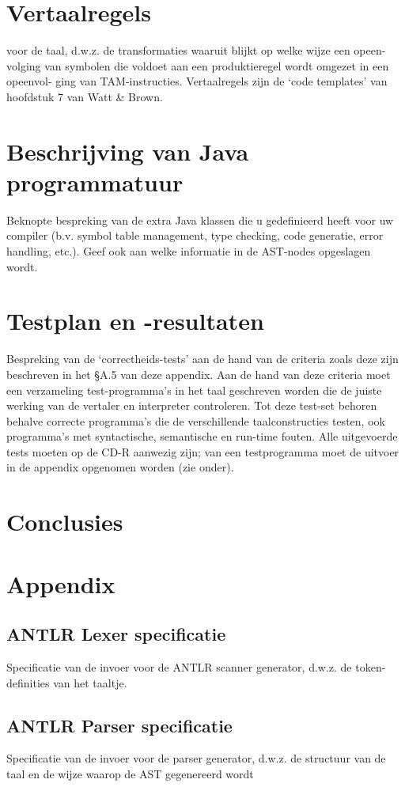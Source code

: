 \documentclass[10pt]{report}
\begin{document}
\section{Vertaalregels}
voor de taal, d.w.z. de transformaties waaruit blijkt op welke wijze een opeen-
volging van symbolen die voldoet aan een produktieregel wordt omgezet in een opeenvol-
ging van TAM-instructies. Vertaalregels zijn de ‘code templates’ van hoofdstuk 7 van Watt
\& Brown.

\section{Beschrijving van Java programmatuur}
Beknopte bespreking van de extra Java klassen die
u gedefinieerd heeft voor uw compiler (b.v. symbol table management, type checking, code
generatie, error handling, etc.). Geef ook aan welke informatie in de AST-nodes opgeslagen
wordt.

\section{Testplan en -resultaten}
Bespreking van de ‘correctheids-tests’ aan de hand van de criteria
zoals deze zijn beschreven in het §A.5 van deze appendix. Aan de hand van deze criteria moet
een verzameling test-programma’s in het taal geschreven worden die de juiste werking van de
vertaler en interpreter controleren. Tot deze test-set behoren behalve correcte programma’s
die de verschillende taalconstructies testen, ook programma’s met syntactische, semantische
en run-time fouten.
Alle uitgevoerde tests moeten op de CD-R aanwezig zijn; van een testprogramma moet de
uitvoer in de appendix opgenomen worden (zie onder).

\section{Conclusies}


\section{Appendix}

\subsection{ANTLR Lexer specificatie}
Specificatie van de invoer voor de ANTLR scanner generator,
d.w.z. de token-definities van het taaltje.

\subsection{ANTLR Parser specificatie}
Specificatie van de invoer voor de parser generator, d.w.z. de
structuur van de taal en de wijze waarop de AST gegenereerd wordt
\end{document}
